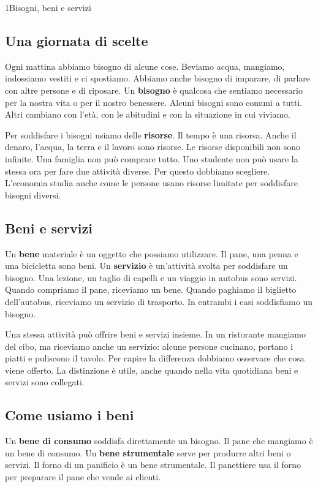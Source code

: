 \begin{lettura}{1}{Bisogni, beni e servizi}


\subsection*{Una giornata di scelte}
Ogni mattina abbiamo bisogno di alcune cose. Beviamo acqua, mangiamo, indossiamo vestiti e ci spostiamo. Abbiamo anche bisogno di imparare, di parlare con altre persone e di riposare. Un \textbf{bisogno} è qualcosa che sentiamo necessario per la nostra vita o per il nostro benessere. Alcuni bisogni sono comuni a tutti. Altri cambiano con l'età, con le abitudini e con la situazione in cui viviamo.

Per soddisfare i bisogni usiamo delle \textbf{risorse}. Il tempo è una risorsa. Anche il denaro, l'acqua, la terra e il lavoro sono risorse. Le risorse disponibili non sono infinite. Una famiglia non può comprare tutto. Uno studente non può usare la stessa ora per fare due attività diverse. Per questo dobbiamo scegliere. L'economia studia anche come le persone usano risorse limitate per soddisfare bisogni diversi.

\subsection*{Beni e servizi}
Un \textbf{bene} materiale è un oggetto che possiamo utilizzare. Il pane, una penna e una bicicletta sono beni. Un \textbf{servizio} è un'attività svolta per soddisfare un bisogno. Una lezione, un taglio di capelli e un viaggio in autobus sono servizi. Quando compriamo il pane, riceviamo un bene. Quando paghiamo il biglietto dell'autobus, riceviamo un servizio di trasporto. In entrambi i casi soddisfiamo un bisogno.

Una stessa attività può offrire beni e servizi insieme. In un ristorante mangiamo del cibo, ma riceviamo anche un servizio: alcune persone cucinano, portano i piatti e puliscono il tavolo. Per capire la differenza dobbiamo osservare che cosa viene offerto. La distinzione è utile, anche quando nella vita quotidiana beni e servizi sono collegati.

\subsection*{Come usiamo i beni}
Un \textbf{bene di consumo} soddisfa direttamente un bisogno. Il pane che mangiamo è un bene di consumo. Un \textbf{bene strumentale} serve per produrre altri beni o servizi. Il forno di un panificio è un bene strumentale. Il panettiere usa il forno per preparare il pane che vende ai clienti.


\end{lettura}
